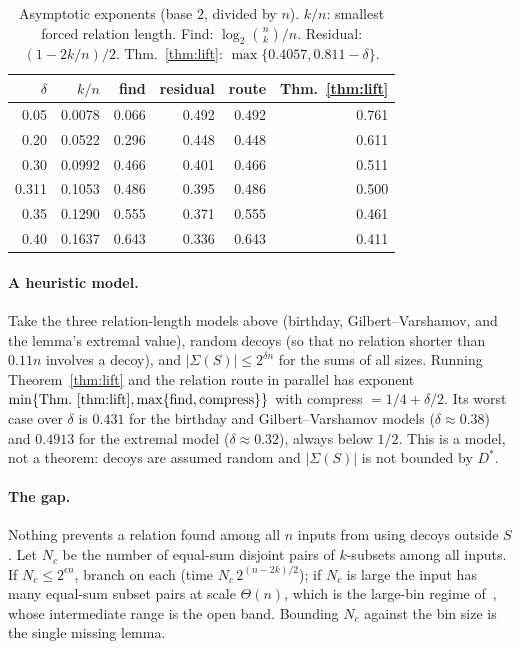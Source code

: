 \documentclass[conference]{IEEEtran}
\begin{document}
\begin{table}[t]
\centering
\caption{Asymptotic exponents (base $2$, divided by $n$). $k/n$: smallest forced
relation length. Find: $\log_2\binom nk/n$. Residual: $(1-2k/n)/2$.
Thm.~\ref{thm:lift}: $\max\{0.4057,0.811-\delta\}$.}
\label{tab:relation}
\begin{tabular}{rrrrrr}
\toprule
$\delta$ & $k/n$ & find & residual & route & Thm.~\ref{thm:lift}\\
\midrule
0.05 & 0.0078 & 0.066 & 0.492 & 0.492 & 0.761\\
0.20 & 0.0522 & 0.296 & 0.448 & 0.448 & 0.611\\
0.30 & 0.0992 & 0.466 & 0.401 & 0.466 & 0.511\\
0.311 & 0.1053 & 0.486 & 0.395 & 0.486 & 0.500\\
0.35 & 0.1290 & 0.555 & 0.371 & 0.555 & 0.461\\
0.40 & 0.1637 & 0.643 & 0.336 & 0.643 & 0.411\\
\bottomrule
\end{tabular}
\end{table}

\paragraph*{A heuristic model.}
Take the three relation-length models above (birthday, Gilbert--Varshamov, and the lemma's
extremal value), random decoys (so that no relation shorter than $0.11n$ involves a
decoy), and $|\Sigma(S)|\le 2^{\delta n}$ for the sums of all sizes. Running
Theorem~\ref{thm:lift} and the relation route in parallel has exponent
$\min\{\text{Thm.~\ref{thm:lift}},\max\{\text{find},\text{compress}\}\}$ with
compress $=1/4+\delta/2$. Its worst case over $\delta$ is $0.431$ for the birthday and
Gilbert--Varshamov models ($\delta\approx0.38$) and $0.4913$ for the extremal model
($\delta\approx0.32$), always below $1/2$. This is a model, not a theorem: decoys are
assumed random and $|\Sigma(S)|$ is not bounded by $D^*$.

\paragraph*{The gap.}
Nothing prevents a relation found among all $n$ inputs from using decoys outside
$S$. Let $N_c$ be the number of equal-sum disjoint pairs of $k$-subsets among all
inputs. If $N_c\le 2^{\epsilon n}$, branch on each (time
$N_c\,2^{(n-2k)/2}$); if $N_c$ is large the input has many equal-sum subset pairs
at scale $\Theta(n)$, which is the large-bin regime of~\cite{akkn}, whose
intermediate range is the open band. Bounding $N_c$ against the bin size is the
single missing lemma.
\end{document}
